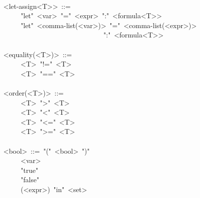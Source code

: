\begin{mdpre}
\\
{\textless{}let-assign\textless{}T\textgreater{}\textgreater{}}~::=\\
~~~~\textbar{}~"let"~{\textless{}var\textgreater{}}~"="~{\textless{}expr\textgreater{}}~":"~{\textless{}formula\textless{}T\textgreater{}\textgreater{}}\\
~~~~\textbar{}~"let"~{\textless{}comma-list(\textless{}var\textgreater{})\textgreater{}}~"="~{\textless{}comma-list(\textless{}expr\textgreater{})\textgreater{}}\\
~~~~~~~~~~~~~~~~~~~~~~~~~~~~~":"~{\textless{}formula\textless{}T\textgreater{}\textgreater{}}\\
\\
{\textless{}equality(\textless{}T\textgreater{})\textgreater{}}~::=\\
~~~~\textbar{}~{\textless{}T\textgreater{}}~"!="~{\textless{}T\textgreater{}}\\
~~~~\textbar{}~{\textless{}T\textgreater{}}~"=="~{\textless{}T\textgreater{}}\\
\\
{\textless{}order(\textless{}T\textgreater{})\textgreater{}}~::=\\
~~~~\textbar{}~{\textless{}T\textgreater{}}~"\textgreater{}"~{\textless{}T\textgreater{}}\\
~~~~\textbar{}~{\textless{}T\textgreater{}}~"\textless{}"~{\textless{}T\textgreater{}}\\
~~~~\textbar{}~{\textless{}T\textgreater{}}~"\textless{}="~{\textless{}T\textgreater{}}\\
~~~~\textbar{}~{\textless{}T\textgreater{}}~"\textgreater{}="~{\textless{}T\textgreater{}}\\
\\
{\textless{}bool\textgreater{}}~::=~"("~{\textless{}bool\textgreater{}}~")"\\
~~~~\textbar{}~{\textless{}var\textgreater{}}\\
~~~~\textbar{}~"true"\\
~~~~\textbar{}~"false"\\
~~~~\textbar{}~({\textless{}expr\textgreater{}})~"in"~{\textless{}set\textgreater{}}\\

\end{mdpre}
